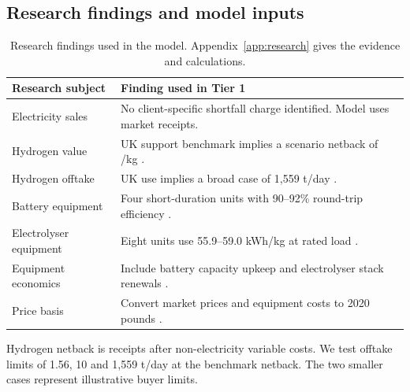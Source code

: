 \subsection{Research findings and model inputs}
\begin{table}[H]
\centering\small
\caption{Research findings used in the model. Appendix~\ref{app:research} gives the evidence and calculations.}
\label{tab:findings}
\begin{tabularx}{\linewidth}{@{}lY@{}}
\toprule
Research subject & Finding used in Tier 1 \\
\midrule
Electricity sales & No client-specific shortfall charge identified. Model uses market receipts. \\
Hydrogen value & UK support benchmark implies a scenario netback of /kg \cite{har}. \\
Hydrogen offtake & UK use implies a broad case of 1,559 t/day \cite{eho}. \\
Battery equipment & Four short-duration units with 90--92\% round-trip efficiency \cite{v6}. \\
Electrolyser equipment & Eight units use 55.9--59.0 kWh/kg at rated load \cite{v6}. \\
Equipment economics & Include battery capacity upkeep and electrolyser stack renewals \cite{beis,v6}. \\
Price basis & Convert market prices and equipment costs to 2020 pounds \cite{cpi,basis}. \\
\bottomrule
\end{tabularx}
\end{table}


Hydrogen netback is receipts after non-electricity variable costs.
We test offtake limits of 1.56, 10 and 1,559 t/day at the benchmark
netback. The two smaller cases represent illustrative buyer limits.

\newpage
